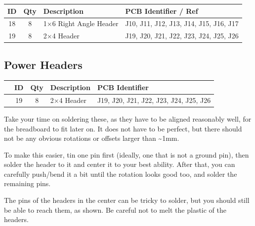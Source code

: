 \documentclass[12pt, a4paper]{article}
\newcommand{\checkbox}[1]{\CheckBox[backgroundcolor=0.86 0.828 0.71, name=#1]{}}
\begin{document}
\begin{center}
    \small
    \setlength\extrarowheight{4pt}
    \begin{tabularx}{\textwidth}{|c|c|X|l|}
        \hline \rowcolor{lightgray} ID & Qty & Description & PCB Identifier / Ref\\
        \hline 18 & 8 & 1×6 Right Angle Header & J10, J11, J12, J13, J14, J15, J16, J17\\
        \hline 19 & 8 & 2×4 Header & J19, J20, J21, J22, J23, J24, J25, J26\\
        \hline
    \end{tabularx}
\end{center}

\pagebreak

\subsection{Power Headers}

\begin{center}
    \small
    \setlength\extrarowheight{8pt}
    \begin{tabularx}{\textwidth}{|c|c|c|X|l|}
        \hline\rowcolor{lightgray} & ID & Qty & Description & PCB Identifier\\
        \hline\checkbox{fa} & 19 & 8 & 2×4 Header & J19, J20, J21, J22, J23, J24, J25, J26\\
        \hline
    \end{tabularx}
\end{center}

Take your time on soldering these, as they have to be aligned reasonably well, for the
breadboard to fit later on. It does not have to be perfect, but there should not be any obvious
rotations or offsets larger than \textasciitilde1mm.

To make this easier, tin one pin first (ideally, one that is not a ground pin), then solder the
header to it and center it to your best ability. After that, you can carefully push/bend it a
bit until the rotation looks good too, and solder the remaining pins.

The pins of the headers in the center can be tricky to solder, but you should still be able to
reach them, as shown. Be careful not to melt the plastic of the headers.
\end{document}
